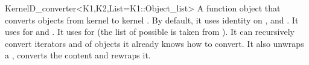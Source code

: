 \begin{ccRefClass}{KernelD_converter<K1,K2,List=K1::Object_list>}
\ccDefinition
A function object that converts objects from kernel  to kernel . By default, it uses identity on ,  and . It uses  for  and . It uses  for  (the list of possible  is taken from ). It can recursively convert iterators and  of objects it already knows how to convert. It also unwraps a , converts the content and rewraps it.


\end{ccRefClass}
